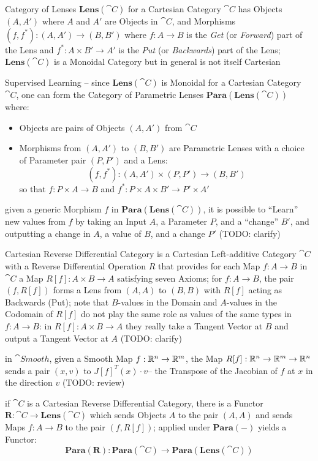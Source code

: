 Category of Lenses $\mathbf{Lens}(\cat{C})$ for a Cartesian Category $\cat{C}$
has Objects $(A,A')$ where $A$ and $A'$ are Objects in $\cat{C}$, and Morphisms
$(f,f^*) : (A,A') \to (B,B')$ where $f : A \to B$ is the \emph{Get} (or
\emph{Forward}) part of the Lens and $f^* : A \times B' \to A'$ is the
\emph{Put} (or \emph{Backwards}) part of the Lens; $\mathbf{Lens}(\cat{C})$ is a
Monoidal Category but in general is not itself Cartesian

Supervised Learning -- since $\mathbf{Lens}(\cat{C})$ is Monoidal for a
Cartesian Category $\cat{C}$, one can form the Category of Parametric Lenses
$\mathbf{Para}(\mathbf{Lens}(\cat{C}))$ where:
\begin{itemize}
  \item Objects are pairs of Objects $(A,A')$ from $\cat{C}$
  \item Morphisms from $(A,A')$ to $(B,B')$ are Parametric Lenses with a choice
    of Parameter pair $(P,P')$ and a Lens:
    \[
      (f,f^*) : (A,A') \times (P,P') \to (B,B')
    \]
    so that $f : P \times A \to B$ and
    $f^* : P \times A \times B' \to P' \times A'$
\end{itemize}

given a generic Morphism $f$ in $\mathbf{Para}(\mathbf{Lens}(\cat{C}))$, it is
possible to ``Learn'' new values from $f$ by taking an Input $A$, a Parameter
$P$, and a ``change'' $B'$, and outputting a change in $A$, a value of $B$, and
a change $P'$ (TODO: clarify)

Cartesian Reverse Differential Category is a Cartesian Left-additive Category
$\cat{C}$ with a Reverse Differential Operation $R$ that provides for each Map
$f : A \to B$ in $\cat{C}$ a Map $R[f] : A \times B \to A$ satisfying seven
Axioms;
for $f : A \to B$, the pair $(f,R[f])$ forms a Lens from $(A,A)$ to $(B,B)$ with
$R[f]$ acting as Backwards (Put); note that $B$-values in the Domain and
$A$-values in the Codomain of $R[f]$ do not play the same role as values of the
same types in $f : A \to B$: in $R[f] : A \times B \to A$ they really take a
Tangent Vector at $B$ and output a Tangent Vector at $A$ (TODO: clarify)

in $\cat{Smooth}$, given a Smooth Map $f : \mathbb{R}^n \to \mathbb{R}^m$, the Map
$R[f] : \mathbb{R}^n \to \mathbb{R}^m \to \mathbb{R}^n$ sends a pair $(x,v)$ to
$J[f]^T(x) \cdot v$-- the Transpose of the Jacobian of $f$ at $x$ in the
direction $v$
(TODO: review)

if $\cat{C}$ is a Cartesian Reverse Differential Category, there is a Functor
$\mathbf{R} : \cat{C} \to \mathbf{Lens}(\cat{C})$ which sends Objects $A$ to the
pair $(A,A)$ and sends Maps $f : A \to B$ to the pair $(f, R[f])$;
applied under $\mathbf{Para}(-)$ yields a Functor:
\[
  \mathbf{Para}(\mathbf{R}) :
    \mathbf{Para}(\cat{C}) \to \mathbf{Para}(\mathbf{Lens}(\cat{C}))
\]

